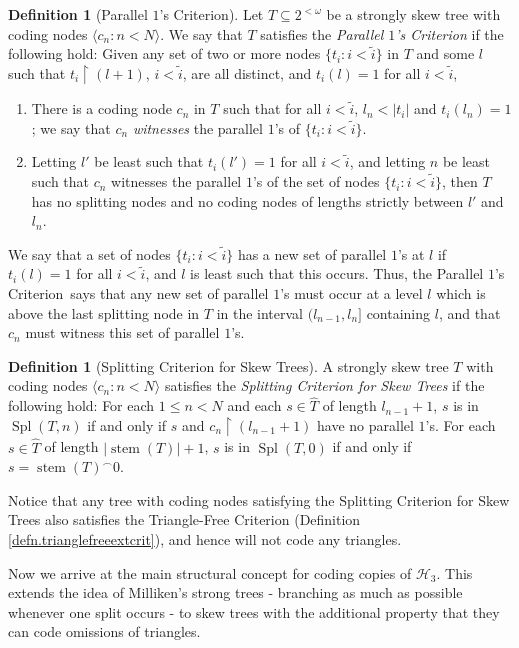 \documentclass{amsart}
\theoremstyle{remark}
\theoremstyle{definition}
\newtheorem{defn}[thm]{Definition}
\theoremstyle{remark}
\newcommand{\om}{\omega}
\newcommand{\sse}{\subseteq}
\DeclareMathOperator{\stem}{stem}
\DeclareMathOperator{\Spl}{Spl}
\newcommand{\re}{\restriction}
\newcommand{\lgl}{\langle}
\newcommand{\rgl}{\rangle}
\newcommand{\POC}{Parallel $1$'s Criterion}
\begin{document}
\begin{defn}[\POC]\label{defn.parallel1sProp}
Let $T\sse 2^{<\om}$ be a  strongly skew tree with coding nodes $\lgl c_n:n<N\rgl$.
We say that $T$ satisfies the {\em \POC} if
the following hold:
Given any
 set of two or more nodes $\{t_i:i<\tilde{i}\}$ in $T$
and some $l$ such that $t_i\re(l+1)$, $i<\tilde{i}$, are all distinct, and
 $t_i(l)=1$ for all $i<\tilde{i}$,
\begin{enumerate}
\item
There is a coding node $c_n$ in $T$ such that
 for all $i<\tilde{i}$,
$l_n<|t_i|$ and
$t_i(l_n)=1$;
we say that  $c_n$ {\em witnesses} the parallel $1$'s of $\{t_i:i<\tilde{i}\}$.
\item
Letting $l'$ be  least such that
$t_i(l')=1$ for all $i<\tilde{i}$,
and  letting
$n$ be
 least  such that $c_{n}$ witnesses the parallel $1$'s of the set of nodes $\{t_i:i<\tilde{i}\}$,
then $T$ has no splitting nodes and no coding nodes
 of lengths strictly  between $l'$ and $l_{n}$.
\end{enumerate}
\end{defn}


We say that a set of nodes $\{t_i:i<\tilde{i}\}$ has a new set of parallel $1$'s at $l$ if $t_i(l)=1$ for all $i<\tilde{i}$, and $l$ is least such that this occurs.
Thus, the \POC\ says that any new set of parallel $1$'s must occur at a level $l$  which is above the last splitting node in $T$ in the interval $(l_{n-1},l_n]$ containing $l$,
and that  $c_n$ must witness this set of parallel $1$'s.



\begin{defn}[Splitting Criterion for Skew Trees]\label{defn.splitcritst}
A  strongly skew tree
$T$ with coding nodes $\lgl c_n:n<N\rgl$  satisfies the {\em Splitting Criterion for Skew Trees} if  the following hold:
For each $1\le n<N$ and each  $s\in \widehat{T}$ of length $l_{n-1}+1$,
$s$ is in $\Spl(T,n)$ if and only if
 $s$ and $c_n\re (l_{n-1}+1)$ have no parallel $1$'s.
For each $s\in\widehat{T}$  of length $|\stem(T)|+1$,
$s$ is in $\Spl(T,0)$ if and  only if $s={\stem(T)}^{\frown}0$.
\end{defn}


Notice   that any tree with coding nodes satisfying the Splitting Criterion for Skew Trees also satisfies the Triangle-Free Criterion (Definition \ref{defn.trianglefreeextcrit}),
and hence will not code any triangles.


Now we arrive at the main structural  concept for coding copies of $\mathcal{H}_3$.
This  extends the idea of  Milliken's strong trees  - branching as much as possible whenever one split occurs -
to skew trees
with the additional property that they can code omissions of triangles.
\end{document}
